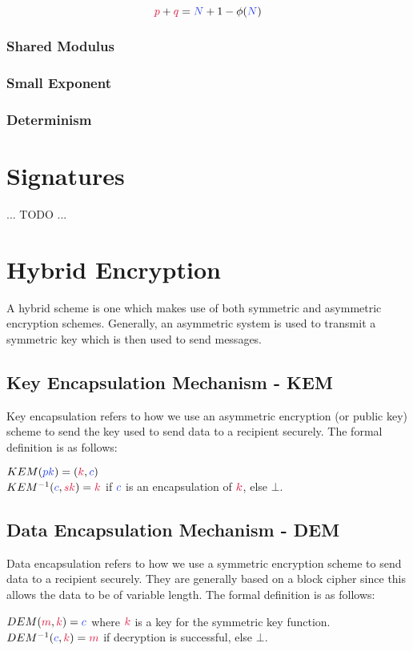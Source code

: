 			$$ \cp + \cq = \cN + 1 - \phi(\cN) $$

		\subsubsection{Shared Modulus}

		\subsubsection{Small Exponent}

		\subsubsection{Determinism}

\section{Signatures}
	... TODO ...


\section{Hybrid Encryption}
	A hybrid scheme is one which makes use of both symmetric and asymmetric encryption schemes. Generally, an asymmetric system is used to transmit a symmetric key which is then used to send messages.\\

	\subsection{Key Encapsulation Mechanism - KEM}
		Key encapsulation refers to how we use an asymmetric encryption (or public key) scheme to send the key used to send data to a recipient securely. The formal definition is as follows:
		\begin{center}
			$KEM(\cpk) = (\cK,\cc)$\\
			$KEM^{-1}(\cc, \csk) = \cK$ \quad if $\cc$ is an encapsulation of $\cK$, else $\bot$.
		\end{center}

	\subsection{Data Encapsulation Mechanism - DEM}
		Data encapsulation refers to how we use a symmetric encryption scheme to send data to a recipient securely. They are generally based on a block cipher since this allows the data to be of variable length. The formal definition is as follows:
		\begin{center}
			$DEM(\cm,\cK) = \cc$ \quad where $\cK$ is a key for the symmetric key function.\\
			$DEM^{-1}(\cc,\ck) = \cm $ \quad if decryption is successful, else $\bot$.
		\end{center}


